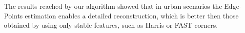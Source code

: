 The results reached by our algorithm showed that in urban scenarios the Edge-Points estimation enables a detailed reconstruction, which is better then those obtained by  using only stable features, such as Harris or FAST corners.


